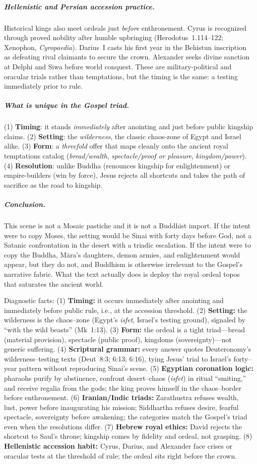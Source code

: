 \subparagraph*{Hellenistic and Persian accession practice.}
Historical kings also meet ordeals just \emph{before} enthronement.
Cyrus is recognized through proved nobility after humble upbringing (Herodotus~1.114--122; Xenophon, \emph{Cyropaedia}).
Darius~I casts his first year in the Behistun inscription as defeating rival claimants to secure the crown.
Alexander seeks divine sanction at Delphi and Siwa before world conquest.
These are military-political and oracular trials rather than temptations, but the timing is the same: a testing immediately prior to rule.

\subparagraph*{What is unique in the Gospel triad.}
(1) \textbf{Timing}: it stands \emph{immediately} after anointing and just before public kingship claims.
(2) \textbf{Setting}: the \emph{wilderness}, the classic chaos-zone of Egypt and Israel alike.
(3) \textbf{Form}: a \emph{threefold} offer that maps cleanly onto the ancient royal temptations catalog (\emph{bread/wealth}, \emph{spectacle/proof or pleasure}, \emph{kingdom/power}).
(4) \textbf{Resolution}: unlike Buddha (renounces kingship for enlightenment) or empire-builders (win by force), Jesus rejects all shortcuts and takes the path of sacrifice as the road to kingship.

\subparagraph*{Conclusion.}
This scene is not a Mosaic pastiche and it is not a Buddhist import.
If the intent were to copy Moses, the setting would be Sinai with forty days before God, not a Satanic confrontation in the desert with a triadic escalation.
If the intent were to copy the Buddha, Māra’s daughters, demon armies, and enlightenment would appear, but they do not, and Buddhism is otherwise irrelevant to the Gospel’s narrative fabric.
What the text actually does is deploy the royal–ordeal topos that saturates the ancient world.

Diagnostic facts:
(1) \textbf{Timing:} it occurs immediately after anointing and immediately before public rule, i.e., at the accession threshold.
(2) \textbf{Setting:} the wilderness is the chaos–zone (Egypt’s \emph{isfet}, Israel’s testing ground), signaled by “with the wild beasts” (Mk~1:13).
(3) \textbf{Form:} the ordeal is a tight triad—bread (material provision), spectacle (public proof), kingdoms (sovereignty)—not generic suffering.
(4) \textbf{Scriptural grammar:} every answer quotes Deuteronomy’s wilderness–testing texts (Deut~8:3; 6:13; 6:16), tying Jesus’ trial to Israel’s forty–year pattern without reproducing Sinai’s scene.
(5) \textbf{Egyptian coronation logic:} pharaohs purify by abstinence, confront desert–chaos (\emph{isfet}) in ritual “smiting,” and receive regalia from the gods; the king proves himself in the chaos–border before enthronement.
(6) \textbf{Iranian/Indic triads:} Zarathustra refuses wealth, lust, power before inaugurating his mission; Siddhartha refuses desire, fearful spectacle, sovereignty before awakening; the categories match the Gospel’s triad even when the resolutions differ.
(7) \textbf{Hebrew royal ethics:} David rejects the shortcut to Saul’s throne; kingship comes by fidelity and ordeal, not grasping.
(8) \textbf{Hellenistic accession habit:} Cyrus, Darius, and Alexander face crises or oracular tests at the threshold of rule; the ordeal sits right before the crown.

